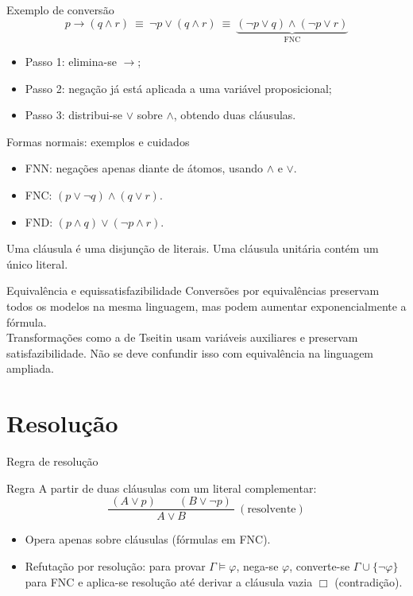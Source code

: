 \documentclass[10pt,aspectratio=169]{beamer}
\newcommand{\dest}[1]{\alert{#1}}
\begin{document}
\begin{frame}{Exemplo de conversão}
  \[
    p \rightarrow (q\land r)
    \ \equiv\ \neg p \lor (q\land r)
    \ \equiv\ \underbrace{(\neg p\lor q)\land(\neg p\lor r)}_{\text{FNC}}
  \]
  \begin{itemize}
    \item Passo 1: elimina-se $\rightarrow$;
    \item Passo 2: negação já está aplicada a uma variável proposicional;
    \item Passo 3: distribui-se $\lor$ sobre $\land$, obtendo duas cláusulas.
  \end{itemize}
\end{frame}


\begin{frame}{Formas normais: exemplos e cuidados}

\begin{itemize}
\item \dest{FNN}: negações apenas diante de átomos, usando $\land$ e $\lor$.
\item \dest{FNC}: $(p\lor\neg q)\land(q\lor r)$.
\item \dest{FND}: $(p\land q)\lor(\neg p\land r)$.
\end{itemize}
Uma cláusula é uma disjunção de literais. Uma cláusula unitária contém um único literal.
\begin{block}{Equivalência e equissatisfazibilidade}
Conversões por equivalências preservam todos os modelos na mesma linguagem, mas podem aumentar exponencialmente a fórmula.\\
Transformações como a de Tseitin usam variáveis auxiliares e preservam satisfazibilidade. Não se deve confundir isso com equivalência na linguagem ampliada.
\end{block}
\end{frame}

\section{Resolução}
\begin{frame}{Regra de resolução}
  \begin{block}{Regra}
    A partir de duas cláusulas com um literal complementar:
    \[
      \dfrac{\ (A \lor p)\qquad (B\lor\neg p)\ }{A\lor B}\ (\text{resolvente})
    \]
  \end{block}
  \begin{itemize}
    \item Opera apenas sobre \dest{cláusulas} (fórmulas em FNC).
    \item \dest{Refutação por resolução}: para provar $\Gamma\models\varphi$, nega-se $\varphi$, converte-se $\Gamma\cup\{\neg\varphi\}$ para FNC e aplica-se resolução até derivar a \dest{cláusula vazia} $\Box$ (contradição).
  \end{itemize}
\end{frame}
\end{document}
